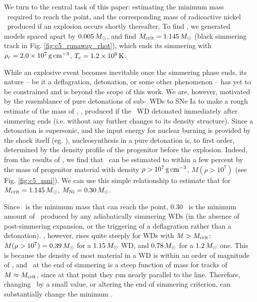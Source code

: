 We turn to the central task of this paper: estimating the minimum mass \Mcrit\ required to reach the \citeal{wooswk04} point, and the corresponding mass of radioactive nickel \MNi\ produced if an explosion occurs shortly thereafter.  To find \Mcrit, we generated models spaced apart by $0.005\,\Msun$, and find $\Mcrit=1.145\,\Msun$ (black simmering track in Fig. \ref{fig:c5_runaway_rhot}), which ends its simmering with $\rhoc = 2.0\times10^7\,\gcc$, $\Tc = 1.2\times10^9\,\mrm{K}$.

While an explosive event becomes inevitable once the simmering phase ends, its nature -- be it a deflagration, detonation, or some other phenomenon -- has yet to be constrained and is beyond the scope of this work.  We are, however, motivated by the resemblance of pure detonations of sub-\Mch\ WDs to SNe Ia to make a rough estimate of the mass of \Ni, \MNi, produced if the \Mcrit\ WD detonated immediately after simmering ends (i.e. without any further changes to its density structure).  Since a detonation is supersonic, and the input energy for nuclear burning is provided by the shock itself (eg. \citealt{seit+09}), nucleosynthesis in a pure detonation is, to first order, determined by the density profile of the progenitor before the explosion.  Indeed, from the results of \cite{sim+10}, we find that \MNi\ can be estimated to within a few percent by the mass of progenitor material with density $\rho>10^7\,\gcc$, $M(\rho>10^7)$ (see Fig. \ref{fig:c5_mni}).  We can use this simple relationship to estimate that for $\Mcrit = 1.145\,\Msun$, $\MNi = 0.30\,\Msun$.  

Since \Mcrit\ is the minimum mass that can reach the \citeal{wooswk04} point, 0.30 \Msun\ is the minimum amount of \Ni\ produced by any adiabatically simmering WDs (in the absence of post-simmering expansion, or the triggering of a deflagration rather than a detonation).  \MNi, however, rises quite steeply for WDs with $M>\Mcrit$: $M(\rho>10^7) = 0.39\,\Msun$ for a $1.15\,\Msun$ WD, and $0.78\,\Msun$ for a $1.2\,\Msun$ one.  This is because the density of most material in a WD is within an order of magnitude of \rhoc, and \rhoc\ at the end of simmering is a steep function of mass for tracks of $M \approx \Mcrit$, since at that point they run nearly parallel to the \citeal{wooswk04} line.  Therefore, changing \Mcrit\ by a small value, or altering the end of simmering criterion, can substantially change the minimum \MNi.


